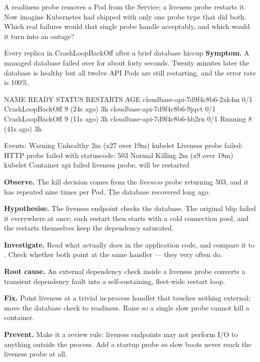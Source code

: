 \begin{thinkbox}
A readiness probe removes a Pod from the Service; a liveness probe restarts it. Now imagine Kubernetes had shipped with only one probe type that did both. Which real failures would that single probe handle acceptably, and which would it turn into an outage?
\end{thinkbox}


\begin{debuglab}{Every replica in CrashLoopBackOff after a brief database hiccup}
\textbf{Symptom.} A managed database failed over for about forty seconds. Twenty minutes later the database is healthy but all twelve API Pods are still restarting, and the error rate is 100\%.

\begin{outbox}
NAME                             READY   STATUS             RESTARTS      AGE
cloudbase-api-7d9f4c8b6-2xk4m    0/1     CrashLoopBackOff   9 (24s ago)   3h
cloudbase-api-7d9f4c8b6-9jqvt    0/1     CrashLoopBackOff   9 (11s ago)   3h
cloudbase-api-7d9f4c8b6-hb2rn    0/1     Running            8 (41s ago)   3h

Events:
  Warning  Unhealthy  2m (x27 over 19m)  kubelet  Liveness probe failed:
           HTTP probe failed with statuscode: 503
  Normal   Killing    2m (x9 over 18m)   kubelet  Container api failed
           liveness probe, will be restarted
\end{outbox}

\begin{tickcheck}
  \item \textbf{Observe.} The kill decision comes from the \emph{liveness} probe returning 503, and it has repeated nine times per Pod. The database recovered long ago.
  \item \textbf{Hypothesise.} The liveness endpoint checks the database. The original blip failed it everywhere at once; each restart then starts with a cold connection pool, and the restarts themselves keep the dependency saturated.
  \item \textbf{Investigate.} Read what  actually does in the application code, and compare it to . Check whether both point at the same handler --- they very often do.
  \item \textbf{Root cause.} An external dependency check inside a liveness probe converts a transient dependency fault into a self-sustaining, fleet-wide restart loop.
  \item \textbf{Fix.} Point liveness at a trivial in-process handler that touches nothing external; move the database check to readiness. Raise  so a single slow probe cannot kill a container.
  \item \textbf{Prevent.} Make it a review rule: liveness endpoints may not perform I/O to anything outside the process. Add a startup probe so slow boots never reach the liveness probe at all.
\end{tickcheck}
\end{debuglab}

